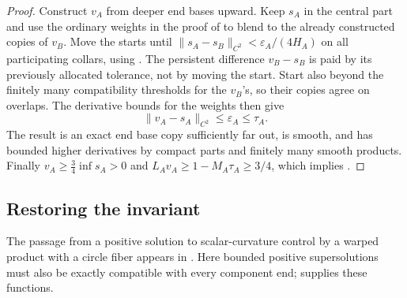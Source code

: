 \begin{proof}
Construct $v_A$ from deeper end bases upward.  Keep $s_A$ in the central
part and use the ordinary weights in the proof of
 to blend to the already constructed copies
of $v_B$.  Move the starts until
$\|s_A-s_B\|_{C^2}<\varepsilon_A/(4H_A)$ on all participating
collars, using .  The persistent difference
$v_B-s_B$ is paid by its previously allocated tolerance, not by moving
the start.  Start also beyond the finitely many compatibility
thresholds for the $v_B$'s, so their copies agree on overlaps.
The derivative bounds for the weights then give
\[
 \|v_A-s_A\|_{C^2}\le\varepsilon_A\le\tau_A.
\]
The result is an exact end base copy sufficiently far out, is smooth,
and has bounded higher derivatives by compact parts and finitely
many smooth products.  Finally $v_A\ge\tfrac34\inf s_A>0$ and
$L_Av_A\ge1-M_A\tau_A\ge3/4$, which implies
.
\end{proof}

\subsection{Restoring the invariant}

The passage from a positive solution to scalar-curvature control by a
warped product with a circle fiber appears in
\citet[Theorem~4\textup{(ii)}]{fischerColbrieSchoen1980}.
Here bounded positive supersolutions must also be exactly compatible
with every component end;  supplies these functions.



